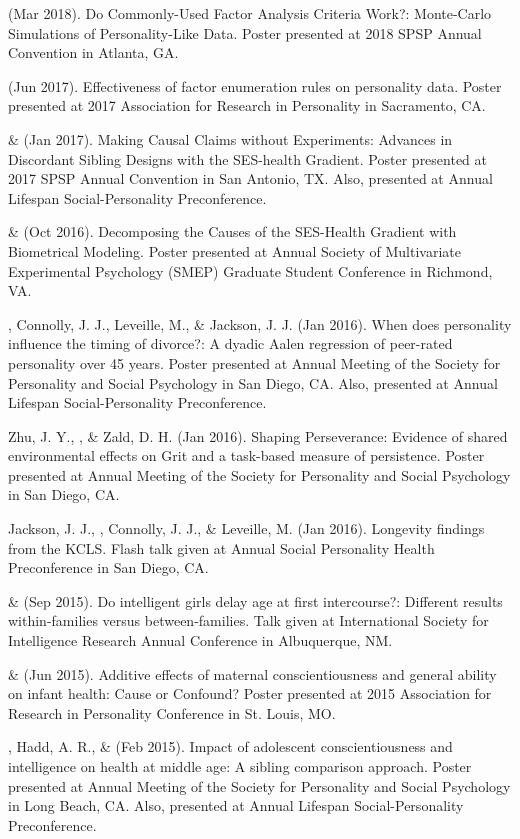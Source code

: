 \item\meb (Mar 2018). Do Commonly-Used Factor Analysis Criteria Work?: Monte-Carlo Simulations of Personality-Like Data. Poster presented at 2018 SPSP Annual Convention in Atlanta, GA. 
%
\item\meb (Jun 2017). Effectiveness of factor enumeration rules on personality data. Poster presented at 2017 Association for Research in Personality in Sacramento, CA.
%
\item\meb \& \joe (Jan 2017). Making Causal Claims without Experiments: Advances in Discordant Sibling Designs with the SES-health Gradient. Poster presented at 2017 SPSP Annual Convention in San Antonio, TX. Also, presented at Annual Lifespan Social-Personality Preconference.
%
\item\meb \& \joe (Oct 2016). Decomposing the Causes of the SES-Health Gradient with Biometrical Modeling. Poster presented at Annual Society of Multivariate Experimental Psychology (SMEP) Graduate Student Conference in Richmond, VA.
%
\item \meb, Connolly, J. J., Leveille, M., \& Jackson, J. J. (Jan 2016). When does personality influence the timing of divorce?: A dyadic Aalen regression of peer-rated personality over 45 years. Poster presented at Annual Meeting of the Society for Personality and Social Psychology in San Diego, CA. Also, presented at Annual Lifespan Social-Personality Preconference.
%
\item Zhu, J. Y., \meb, \joe \& Zald, D. H. (Jan 2016). Shaping Perseverance: Evidence of shared environmental effects on Grit and a task-based measure of persistence. Poster presented at Annual Meeting of the Society for Personality and Social Psychology in San Diego, CA.
\item Jackson, J. J., \meb, Connolly, J. J., \& Leveille, M. (Jan 2016). Longevity findings from the KCLS. Flash talk given at Annual Social Personality Health Preconference in San Diego, CA. %
%
\item \joe \& \meb (Sep 2015). Do intelligent girls delay age at first intercourse?: Different results within-families versus between-families. Talk given at International Society for Intelligence Research Annual Conference in Albuquerque, NM.
%
\item \meb \& \joe (Jun 2015). Additive effects of maternal conscientiousness and general ability on infant health: Cause or Confound? Poster presented at 2015 Association for Research in Personality Conference in St. Louis, MO. %
%
\item \meb, Hadd, A. R., \& \joe (Feb 2015). Impact of adolescent conscientiousness and intelligence on health at middle age: A sibling comparison approach. Poster presented at Annual Meeting of the Society for Personality and Social Psychology in Long Beach, CA. Also, presented at Annual Lifespan Social-Personality Preconference.
